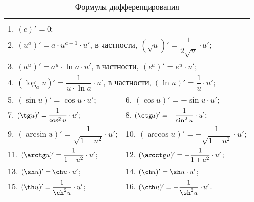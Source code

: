 \begin{table}[h]
  \centering
  \caption{Формулы дифференцирования}
  \begin{tabular}{|ll|}
    \hline
    \vspace{-7pt} & \\
    \multicolumn{2}{|l|}{1. $(c)'=0$;}\\
    \multicolumn{2}{|l|}{2. $\left(u^a\right)'=a \cdot u^{a - 1}\cdot u'$, в частности, $(\sqrt{u})'=\dfrac{1}{2\sqrt{u}}\cdot u'$;}\\[1ex]
    \multicolumn{2}{|l|}{3. $\left(a^u\right)'=a^u\cdot \ln a \cdot u'$, в частности, $(e^u)'=e^u\cdot u'$;}\\
    \multicolumn{2}{|l|}{4. $\left(\log_a u\right)' = \dfrac{1}{u \cdot \ln a}\cdot u'$, в частности, $(\ln u)' = \dfrac{1}{u}\cdot u'$;}\\[2ex]
    5. $(\sin u)' = \cos u \cdot u';$ & 6. $(\cos u)' = -\sin u \cdot u'$;\\[1ex]
    7. $(\tg u)' = \dfrac{1}{\cos^2 u}\cdot u';$ & 8. $(\ctg u)' = -\dfrac{1}{\sin^2 u} \cdot u'$;\\[2ex]
    9. $(\arcsin u)' = \dfrac{1}{\sqrt{1 - u^2}}\cdot u'$; & 10. $(\arccos u)' = -\dfrac{1}{\sqrt{1 - u^2}}\cdot u'$;\\[2ex]
    11. $(\arctg u)' = \dfrac{1}{1+u^2}\cdot u'$; & 12. $(\arcctg u)' = -\dfrac{1}{1+u^2}\cdot u'$;\\[2ex]
    13. $(\sh u)' = \ch u \cdot u'$; & 14. $(\ch u)' = \sh u \cdot u'$;\\[1ex]
    15. $(\th u)' = \dfrac{1}{\ch^2 u} \cdot u'$; & 16. $(\cth u)' = -\dfrac{1}{\sh^2 u} \cdot u'$.\\[2ex]
    \hline
  \end{tabular}
\end{table}







